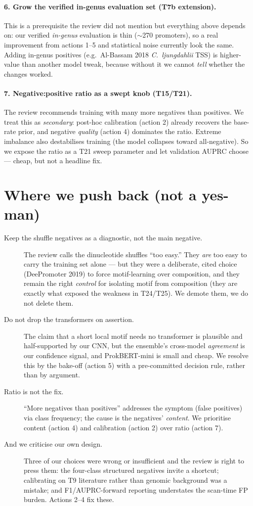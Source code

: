 \documentclass{article}
\begin{document}
\paragraph{6. Grow the verified in-genus evaluation set (T7b extension).}
This is a prerequisite the review did not mention but everything above depends on: our verified \emph{in-genus} evaluation is thin ($\sim$270 promoters), so a real improvement from actions 1--5 and statistical noise currently look the same. Adding in-genus positives (e.g.\ Al-Bassam 2018 \emph{C.\ ljungdahlii} TSS) is higher-value than another model tweak, because without it we cannot \emph{tell} whether the changes worked.

\paragraph{7. Negative:positive ratio as a swept knob (T15/T21).}
The review recommends training with many more negatives than positives. We treat this as \emph{secondary}: post-hoc calibration (action 2) already recovers the base-rate prior, and negative \emph{quality} (action 4) dominates the ratio. Extreme imbalance also destabilises training (the model collapses toward all-negative). So we expose the ratio as a T21 sweep parameter and let validation AUPRC choose --- cheap, but not a headline fix.

\section{Where we push back (not a yes-man)}
\begin{description}
\item[Keep the shuffle negatives as a diagnostic, not the main negative.] The review calls the dinucleotide shuffles ``too easy.'' They \emph{are} too easy to carry the training set alone --- but they were a deliberate, cited choice (DeePromoter 2019) to force motif-learning over composition, and they remain the right \emph{control} for isolating motif from composition (they are exactly what exposed the weakness in T24/T25). We demote them, we do not delete them.
\item[Do not drop the transformers on assertion.] The claim that a short local motif needs no transformer is plausible and half-supported by our CNN, but the ensemble's cross-model \emph{agreement} is our confidence signal, and ProkBERT-mini is small and cheap. We resolve this by the bake-off (action 5) with a pre-committed decision rule, rather than by argument.
\item[Ratio is not the fix.] ``More negatives than positives'' addresses the symptom (false positives) via class frequency; the cause is the negatives' \emph{content}. We prioritise content (action 4) and calibration (action 2) over ratio (action 7).
\item[And we criticise our own design.] Three of our choices were wrong or insufficient and the review is right to press them: the four-class structured negatives invite a shortcut; calibrating on T9 literature rather than genomic background was a mistake; and F1/AUPRC-forward reporting understates the scan-time FP burden. Actions 2--4 fix these.
\end{description}
\end{document}
